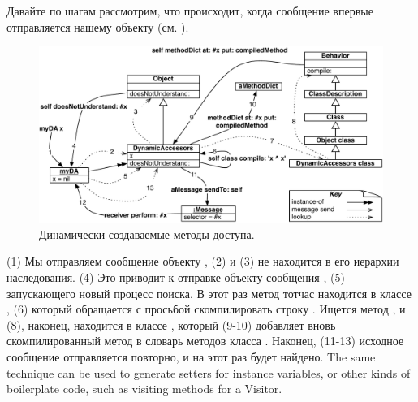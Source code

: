 \documentclass[a4paper,10pt,twoside]{book}
\begin{document}
{%
Давайте по шагам рассмотрим, что происходит, когда сообщение  впервые отправляется нашему объекту (см. ).

\begin{figure}[ht]\centering
	\includegraphics[width=\linewidth]{DynamicAccessors}
	\caption{Динамически создаваемые методы доступа.\figlabel{DynamicAccessors}}
\end{figure}

(1) Мы отправляем сообщение  объекту , (2)  и (3) не находится в его иерархии наследования. (4) Это приводит к отправке объекту сообщения , (5) запускающего новый процесс поиска. В этот раз метод  тотчас находится в классе , (6) который обращается  с просьбой скомпилировать строку . Ищется метод , и (8), наконец, находится в классе , который (9-10) добавляет вновь скомпилированный метод в словарь методов класса . Наконец, (11-13) исходное сообщение отправляется повторно, и на этот раз будет найдено.
The same technique can be used to generate setters for instance variables, or other kinds of boilerplate code, such as visiting methods for a Visitor.

}
\end{document}
